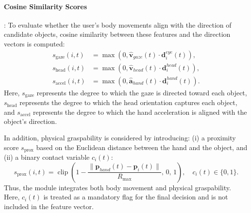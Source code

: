 \documentclass[../../main.tex]{subfiles} %
\begin{document}
\paragraph{Cosine Similarity Scores}:  
To evaluate whether the user’s body movements align with the direction of candidate objects,  
cosine similarity between these features and the direction vectors is computed:
\begin{align}
s_{\text{gaze}}(i,t) &= \max \left(0, \hat{\mathbf{v}}_{gaze}(t)\cdot \mathbf{d}_i^{eye}(t)\right), \\
s_{\text{head}}(i,t) &= \max \left(0, \hat{\mathbf{v}}_{head}(t)\cdot \mathbf{d}_i^{head}(t)\right), \\
s_{\text{accel}}(i,t) &= \max \left(0, \hat{\mathbf{a}}_{hand}(t)\cdot \mathbf{d}_i^{hand}(t)\right).
\end{align}
Here, $s_{\text{gaze}}$ represents the degree to which the gaze is directed toward each object,  
$s_{\text{head}}$ represents the degree to which the head orientation captures each object,  
and $s_{\text{accel}}$ represents the degree to which the hand acceleration is aligned with the object’s direction.  

In addition, physical graspability is considered by introducing:  
(i) a proximity score $s_{\text{prox}}$ based on the Euclidean distance between the hand and the object, and  
(ii) a binary contact variable $c_i(t)$:
\begin{equation}
s_{\text{prox}}(i,t) = \operatorname{clip}\left(1 - \frac{\|\mathbf{p}_{hand}(t)-\mathbf{p}_i(t)\|}{R_{\max}},\,0,\,1\right), \quad
c_i(t) \in \{0,1\}.
\end{equation}
Thus, the module integrates both body movement and physical graspability.  
Here, $c_i(t)$ is treated as a mandatory flag for the final decision and is not included in the feature vector.
\end{document}
